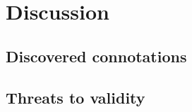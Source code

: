 \chapter{Discussion}\label{ch:discussion}

\section{Discovered connotations}
\section{Threats to validity}
